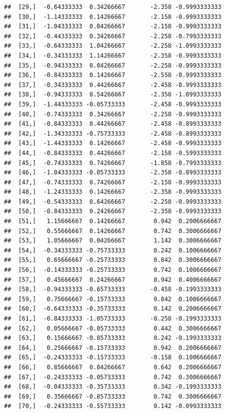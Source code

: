 \documentclass[]{book}
\theoremstyle{definition}
\theoremstyle{definition}
\theoremstyle{definition}
\theoremstyle{remark}
\begin{document}
\begin{verbatim}
##  [29,]  -0.64333333  0.34266667       -2.358 -0.9993333333
##  [30,]  -1.14333333  0.14266667       -2.158 -0.9993333333
##  [31,]  -1.04333333  0.04266667       -2.158 -0.9993333333
##  [32,]  -0.44333333  0.34266667       -2.258 -0.7993333333
##  [33,]  -0.64333333  1.04266667       -2.258 -1.0993333333
##  [34,]  -0.34333333  1.14266667       -2.358 -0.9993333333
##  [35,]  -0.94333333  0.04266667       -2.258 -0.9993333333
##  [36,]  -0.84333333  0.14266667       -2.558 -0.9993333333
##  [37,]  -0.34333333  0.44266667       -2.458 -0.9993333333
##  [38,]  -0.94333333  0.54266667       -2.358 -1.0993333333
##  [39,]  -1.44333333 -0.05733333       -2.458 -0.9993333333
##  [40,]  -0.74333333  0.34266667       -2.258 -0.9993333333
##  [41,]  -0.84333333  0.44266667       -2.458 -0.8993333333
##  [42,]  -1.34333333 -0.75733333       -2.458 -0.8993333333
##  [43,]  -1.44333333  0.14266667       -2.458 -0.9993333333
##  [44,]  -0.84333333  0.44266667       -2.158 -0.5993333333
##  [45,]  -0.74333333  0.74266667       -1.858 -0.7993333333
##  [46,]  -1.04333333 -0.05733333       -2.358 -0.8993333333
##  [47,]  -0.74333333  0.74266667       -2.158 -0.9993333333
##  [48,]  -1.24333333  0.14266667       -2.358 -0.9993333333
##  [49,]  -0.54333333  0.64266667       -2.258 -0.9993333333
##  [50,]  -0.84333333  0.24266667       -2.358 -0.9993333333
##  [51,]   1.15666667  0.14266667        0.942  0.2006666667
##  [52,]   0.55666667  0.14266667        0.742  0.3006666667
##  [53,]   1.05666667  0.04266667        1.142  0.3006666667
##  [54,]  -0.34333333 -0.75733333        0.242  0.1006666667
##  [55,]   0.65666667 -0.25733333        0.842  0.3006666667
##  [56,]  -0.14333333 -0.25733333        0.742  0.1006666667
##  [57,]   0.45666667  0.24266667        0.942  0.4006666667
##  [58,]  -0.94333333 -0.65733333       -0.458 -0.1993333333
##  [59,]   0.75666667 -0.15733333        0.842  0.1006666667
##  [60,]  -0.64333333 -0.35733333        0.142  0.2006666667
##  [61,]  -0.84333333 -1.05733333       -0.258 -0.1993333333
##  [62,]   0.05666667 -0.05733333        0.442  0.3006666667
##  [63,]   0.15666667 -0.85733333        0.242 -0.1993333333
##  [64,]   0.25666667 -0.15733333        0.942  0.2006666667
##  [65,]  -0.24333333 -0.15733333       -0.158  0.1006666667
##  [66,]   0.85666667  0.04266667        0.642  0.2006666667
##  [67,]  -0.24333333 -0.05733333        0.742  0.3006666667
##  [68,]  -0.04333333 -0.35733333        0.342 -0.1993333333
##  [69,]   0.35666667 -0.85733333        0.742  0.3006666667
##  [70,]  -0.24333333 -0.55733333        0.142 -0.0993333333

\end{verbatim}
\end{document}

